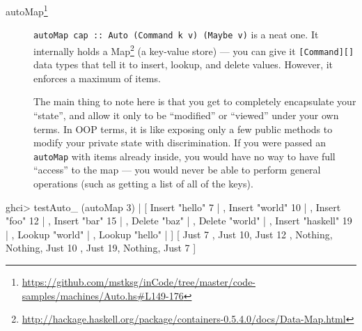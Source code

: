 \documentclass[]{article}
\newenvironment{Shaded}{\begin{snugshade}}{\end{snugshade}}
\newcommand{\DataTypeTok}[1]{\textcolor[rgb]{0.13,0.29,0.53}{#1}}
\newcommand{\DecValTok}[1]{\textcolor[rgb]{0.00,0.00,0.81}{#1}}
\newcommand{\FunctionTok}[1]{\textcolor[rgb]{0.00,0.00,0.00}{#1}}
\newcommand{\NormalTok}[1]{#1}
\newcommand{\StringTok}[1]{\textcolor[rgb]{0.31,0.60,0.02}{#1}}
\renewcommand{\href}[2]{#2\footnote{\url{#1}}}
\begin{document}
\begin{description}
\item[\href{https://github.com/mstksg/inCode/tree/master/code-samples/machines/Auto.hs\#L149-176}{autoMap}]
\texttt{autoMap\ cap\ ::\ Auto\ (Command\ k\ v)\ (Maybe\ v)} is a neat one. It
internally holds a
\href{http://hackage.haskell.org/package/containers-0.5.4.0/docs/Data-Map.html}{Map}
(a key-value store) --- you can give it \texttt{{[}Command{]}{[}{]}} data types
that tell it to insert, lookup, and delete values. However, it enforces a
maximum of items.

The main thing to note here is that you get to completely encapsulate your
``state'', and allow it only to be ``modified'' or ``viewed'' under your own
terms. In OOP terms, it is like exposing only a few public methods to modify
your private state with discrimination. If you were passed an \texttt{autoMap}
with items already inside, you would have no way to have full ``access'' to the
map --- you would never be able to perform general operations (such as getting a
list of all of the keys).
\end{description}

\begin{Shaded}
\begin{Highlighting}[]
\NormalTok{ghci}\FunctionTok{>}\NormalTok{ testAuto_ (autoMap }\DecValTok{3}\NormalTok{)}
    \FunctionTok{|}\NormalTok{   [ }\DataTypeTok{Insert} \StringTok{"hello"} \DecValTok{7}
    \FunctionTok{|}\NormalTok{   , }\DataTypeTok{Insert} \StringTok{"world"} \DecValTok{10}
    \FunctionTok{|}\NormalTok{   , }\DataTypeTok{Insert} \StringTok{"foo"} \DecValTok{12}
    \FunctionTok{|}\NormalTok{   , }\DataTypeTok{Insert} \StringTok{"bar"} \DecValTok{15}
    \FunctionTok{|}\NormalTok{   , }\DataTypeTok{Delete} \StringTok{"baz"}
    \FunctionTok{|}\NormalTok{   , }\DataTypeTok{Delete} \StringTok{"world"}
    \FunctionTok{|}\NormalTok{   , }\DataTypeTok{Insert} \StringTok{"haskell"} \DecValTok{19}
    \FunctionTok{|}\NormalTok{   , }\DataTypeTok{Lookup} \StringTok{"world"}
    \FunctionTok{|}\NormalTok{   , }\DataTypeTok{Lookup} \StringTok{"hello"}
    \FunctionTok{|}\NormalTok{   ]}
\NormalTok{[ }\DataTypeTok{Just} \DecValTok{7}\NormalTok{ , }\DataTypeTok{Just} \DecValTok{10}\NormalTok{, }\DataTypeTok{Just} \DecValTok{12}
\NormalTok{, }\DataTypeTok{Nothing}\NormalTok{, }\DataTypeTok{Nothing}\NormalTok{, }\DataTypeTok{Just} \DecValTok{10}
\NormalTok{, }\DataTypeTok{Just} \DecValTok{19}\NormalTok{, }\DataTypeTok{Nothing}\NormalTok{, }\DataTypeTok{Just} \DecValTok{7}\NormalTok{  ]}
\end{Highlighting}
\end{Shaded}
\end{document}
